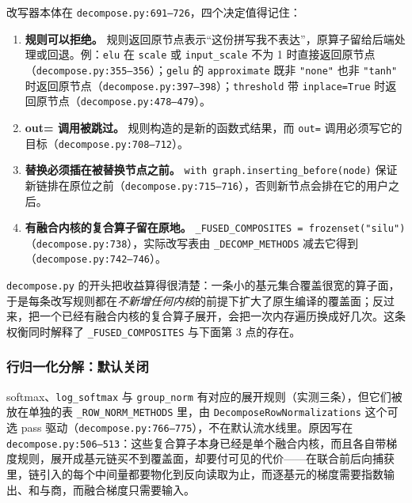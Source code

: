 改写器本体在 \texttt{decompose.py:691--726}，四个决定值得记住：

\begin{enumerate}[nosep, leftmargin=1.2em]
\item \textbf{规则可以拒绝。} 规则返回原节点表示“这份拼写我不表达”，原算子留给后端处理或回退。例：\texttt{elu} 在 \texttt{scale} 或 \texttt{input\_scale} 不为 1 时直接返回原节点（\texttt{decompose.py:355--356}）；\texttt{gelu} 的 \texttt{approximate} 既非 \texttt{"none"} 也非 \texttt{"tanh"} 时返回原节点（\texttt{decompose.py:397--398}）；\texttt{threshold} 带 \texttt{inplace=True} 时返回原节点（\texttt{decompose.py:478--479}）。
\item \textbf{out= 调用被跳过。} 规则构造的是新的函数式结果，而 \texttt{out=} 调用必须写它的目标（\texttt{decompose.py:708--712}）。
\item \textbf{替换必须插在被替换节点之前。} \texttt{with graph.inserting\_before(node)} 保证新链排在原位之前（\texttt{decompose.py:715--716}），否则新节点会排在它的用户之后。
\item \textbf{有融合内核的复合算子留在原地。} \texttt{\_FUSED\_COMPOSITES = frozenset({"silu"})}（\texttt{decompose.py:738}），实际改写表由 \texttt{\_DECOMP\_METHODS} 减去它得到（\texttt{decompose.py:742--746}）。
\end{enumerate}

\begin{tpnote}
\texttt{decompose.py} 的开头把收益算得很清楚：一条小的基元集合覆盖很宽的算子面，于是每条改写规则都在\emph{不新增任何内核}的前提下扩大了原生编译的覆盖面；反过来，把一个已经有融合内核的复合算子展开，会把一次内存遍历换成好几次。这条权衡同时解释了 \texttt{\_FUSED\_COMPOSITES} 与下面第 3 点的存在。
\end{tpnote}

\subsubsection{行归一化分解：默认关闭}

softmax、\texttt{log\_softmax} 与 \texttt{group\_norm} 有对应的展开规则（实测三条），但它们被放在单独的表 \texttt{\_ROW\_NORM\_METHODS} 里，由 \texttt{DecomposeRowNormalizations} 这个可选 pass 驱动（\texttt{decompose.py:766--775}），不在默认流水线里。原因写在 \texttt{decompose.py:506--513}：这些复合算子本身已经是单个融合内核，而且各自带梯度规则，展开成基元链买不到覆盖面，却要付可见的代价——在联合前后向捕获里，链引入的每个中间量都要物化到反向读取为止，而逐基元的梯度需要指数输出、和与商，而融合梯度只需要输入。

